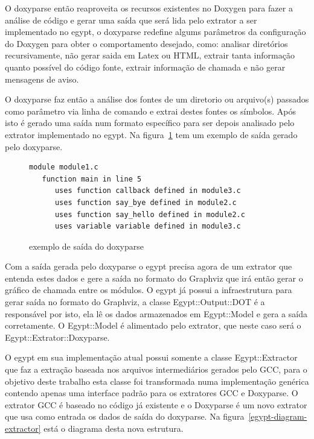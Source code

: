 O doxyparse então reaproveita os recursos existentes no Doxygen para fazer a
análise de código e gerar uma saída que será lida pelo extrator a ser
implementado no egypt, o doxyparse redefine algums parâmetros da configuração
do Doxygen para obter o comportamento desejado, como: analisar diretórios
recursivamente, não gerar saida em Latex ou HTML, extrair tanta informação
quanto possível do código fonte, extrair informação de chamada e não gerar
mensagens de aviso.

O doxyparse faz então a análise dos fontes de um diretorio ou arquivo(s)
passados como parâmetro via linha de comando e extrai destes fontes os
símbolos. Após isto é gerado uma saída num formato específico para ser depois
analisado pelo extrator implementado no egypt. Na
figura~\ref{exemplo-saida-doxyparse} tem um exemplo de saída gerado pelo
doxyparse.

\begin{figure}[h]
\begin{Verbatim}[frame=single,fontsize=\relsize{-2},fontfamily=courier]
module module1.c
   function main in line 5
      uses function callback defined in module3.c
      uses function say_bye defined in module2.c
      uses function say_hello defined in module2.c
      uses variable variable defined in module3.c
\end{Verbatim}
\caption{exemplo de saída do doxyparse}
\label{exemplo-saida-doxyparse}
\end{figure}

Com a saída gerada pelo doxyparse o egypt precisa agora de um extrator que
entenda estes dados e gere a saída no formato do Graphviz que irá então gerar o
gráfico de chamada entre os módulos. O egypt já possui a infraestrutura
para gerar saída no formato do Graphviz, a classe Egypt::Output::DOT é a
responsável por isto, ela lê os dados armazenados em Egypt::Model e gera a
saída corretamente. O Egypt::Model é alimentado pelo extrator, que neste caso será
o Egypt::Extrator::Doxyparse.

O egypt em sua implementação atual possui somente a classe Egypt::Extractor que
faz a extração baseada nos arquivos intermediários gerados pelo GCC, para o
objetivo deste trabalho esta classe foi transformada numa implementação
genérica contendo apenas uma interface padrão para os extratores GCC e
Doxyparse. O extrator GCC é baseado no código já existente e o Doxyparse é um
novo extrator que usa como entrada os dados de saída do doxyparse. Na
figura~\ref{egypt-diagram-extractor} está o diagrama desta nova estrutura.

